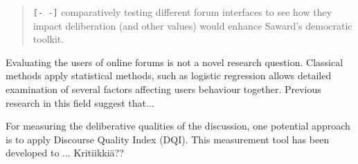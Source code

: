 \documentclass[journal,a4paper]{IEEEtran}
\begin{document}
\begin{quote}
\texttt{[- -]} comparatively testing different forum interfaces to see how they impact deliberation (and other values) would 
enhance Saward’s democratic toolkit.
\end{quote}

Evaluating the users of online forums is not a novel research question. Classical methods apply statistical methods, such as logistic regression allows detailed examination of several factors affecting users behaviour together. Previous research in this field suggest that...

For measuring the deliberative qualities of the discussion, one potential approach is to apply  Discourse Quality Index (DQI). This measurement tool has been developed to ... Kritiikkiä??



\end{document}
